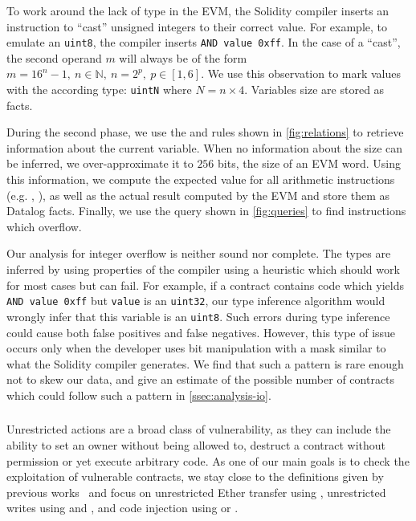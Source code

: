 To work around the lack of type in the EVM, the Solidity compiler inserts an  instruction to ``cast'' unsigned integers to their correct value. For example, to emulate an \lstinline{uint8}, the compiler inserts \lstinline{AND value 0xff}. In the case of a ``cast'', the second operand $m$ will always be of the form $m = 16^n - 1,~n\in \mathbb{N},~n = 2^p,~p \in [1, 6]$. We use this observation to mark values with the according type: \lstinline{uintN} where $N = n \times 4$. Variables size are stored as  facts.

During the second phase, we use the  and  rules shown in \autoref{fig:relations} to retrieve information about the current variable. When no information about the size can be inferred, we over-approximate it to $256$ bits, the size of an EVM word. Using this information, we compute the expected value for all arithmetic instructions (e.g. , ), as well as the actual result computed by the EVM and store them as Datalog facts. Finally, we use the query shown in \autoref{fig:queries} to find instructions which overflow.

\correctness Our analysis for integer overflow is neither sound nor complete. The types are inferred by using properties of the compiler using a heuristic which should work for most cases but can fail.
For example, if a contract contains code which yields \lstinline{AND value 0xff} but \lstinline{value} is an \lstinline{uint32}, our type inference algorithm would wrongly infer that this variable is an \lstinline{uint8}.
Such errors during type inference could cause both false positives and false negatives.
However, this type of issue occurs only when the developer uses bit manipulation with a mask similar to what the Solidity compiler generates.
We find that such a pattern is rare enough not to skew our data, and give an estimate of the possible number of contracts which could follow such a pattern in \autoref{ssec:analysis-io}.

\subsubsection{\unrestrictedaction}
\label{ssec:method-ua}
Unrestricted actions are a broad class of vulnerability, as they can include the ability to set an owner without being allowed to, destruct a contract without permission or yet execute arbitrary code.
As one of our main goals is to check the exploitation of vulnerable contracts, we stay close to the definitions given by previous works~\cite{Krupp2018} and focus on unrestricted Ether transfer using , unrestricted writes using and , and code injection using  or .

